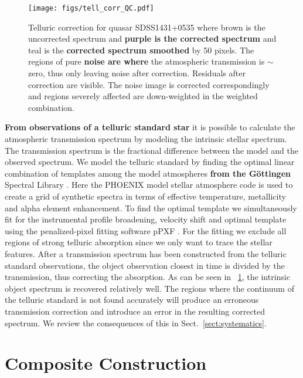 \documentclass{aa}    %
\newcommand{\figref}[1]{\ref{fig:#1}}
\newcommand{\Fig}[1]{\figurename~\figref{#1}}
\newcommand{\fig}[1]{\Fig{#1}}
\newcommand{\figlabel}[1]{\label{fig:#1}}
\newcommand{\sectionname}{Sect.}
\newcommand{\Sect}[1]{\sectionname~\ref{sect:#1}}
\newcommand{\sect}[1]{\Sect{#1}}
\newcommand{\sectlabel}[1]{\label{sect:#1}}
\begin{document}
\begin{figure}[t!]
  \centering
  \texttt{[image: figs/tell\_corr\_QC.pdf]}
  \caption[]{Telluric correction for quasar SDSS1431+0535 where brown is the
uncorrected spectrum and \textbf{purple is the corrected spectrum} and teal is the \textbf{corrected
spectrum smoothed} by 50 pixels. The regions of pure \textbf{noise are where} the atmospheric
transmission is $\sim$ zero, thus only leaving noise after correction. Residuals
after correction are visible. The noise image is corrected correspondingly and
regions severely affected are down-weighted in the weighted combination.}
\figlabel{telluric_qc}
\end{figure}


\textbf{From observations of a telluric standard star} it is possible to calculate
the atmospheric transmission spectrum by modeling the intrinsic stellar
spectrum. The transmission spectrum is the fractional difference between the
model and the observed spectrum. We model the telluric standard by finding the
optimal linear combination of templates among the model atmospheres \textbf{from the
G\"ottingen} Spectral Library \citep{Husser2013}. Here the PHOENIX model stellar
atmosphere code is used to create a grid of synthetic spectra in terms of
effective temperature, metallicity and alpha element enhancement. To find the
optimal template we simultaneously fit for the instrumental profile broadening,
velocity shift and optimal template using the penalized-pixel fitting software
pPXF \citep{Cappellari2004}. For the fitting we exclude all regions of strong
telluric absorption since we only want to trace the stellar features. After a
transmission spectrum has been constructed from the telluric standard
observations, the object observation closest in time is divided by the
transmission, thus correcting the absorption. As can be seen in
\fig{telluric_qc}, the intrinsic object spectrum is recovered relatively well.
The regions where the continuum of the telluric standard is not found accurately
will produce an erroneous transmission correction and introduce an error in the
resulting corrected spectrum. We review the consequences of this in
\sect{systematics}. 


\section{Composite Construction}   \sectlabel{construct}
\end{document}
